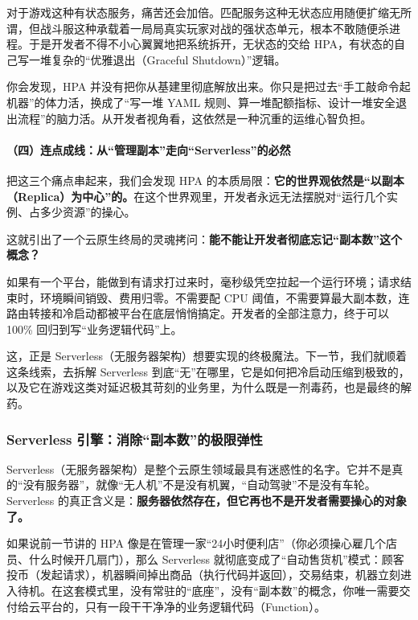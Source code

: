 对于游戏这种有状态服务，痛苦还会加倍。匹配服务这种无状态应用随便扩缩无所谓，但战斗服这种承载着一局局真实玩家对战的强状态单元，根本不敢随便杀进程。于是开发者不得不小心翼翼地把系统拆开，无状态的交给 HPA，有状态的自己写一堆复杂的“优雅退出（Graceful Shutdown）”逻辑。

你会发现，HPA 并没有把你从基建里彻底解放出来。你只是把过去“手工敲命令起机器”的体力活，换成了“写一堆 YAML 规则、算一堆配额指标、设计一堆安全退出流程”的脑力活。从开发者视角看，这依然是一种沉重的运维心智负担。

\paragraph{（四）连点成线：从“管理副本”走向“Serverless”的必然}

把这三个痛点串起来，我们会发现 HPA 的本质局限：\textbf{它的世界观依然是“以副本（Replica）为中心”的。}在这个世界观里，开发者永远无法摆脱对“运行几个实例、占多少资源”的操心。

这就引出了一个云原生终局的灵魂拷问：\textbf{能不能让开发者彻底忘记“副本数”这个概念？}

如果有一个平台，能做到有请求打过来时，毫秒级凭空拉起一个运行环境；请求结束时，环境瞬间销毁、费用归零。不需要配 CPU 阈值，不需要算最大副本数，连路由转接和冷启动都被平台在底层悄悄搞定。开发者的全部注意力，终于可以 100\% 回归到写“业务逻辑代码”上。

这，正是 Serverless（无服务器架构）想要实现的终极魔法。下一节，我们就顺着这条线索，去拆解 Serverless 到底“无”在哪里，它是如何把冷启动压缩到极致的，以及它在游戏这类对延迟极其苛刻的业务里，为什么既是一剂毒药，也是最终的解药。


\subsubsection{Serverless 引擎：消除“副本数”的极限弹性}

Serverless（无服务器架构）是整个云原生领域最具有迷惑性的名字。它并不是真的“没有服务器”，就像“无人机”不是没有机翼，“自动驾驶”不是没有车轮。Serverless 的真正含义是：\textbf{服务器依然存在，但它再也不是开发者需要操心的对象了。}

如果说前一节讲的 HPA 像是在管理一家“24小时便利店”（你必须操心雇几个店员、什么时候开几扇门），那么 Serverless 就彻底变成了“自动售货机”模式：顾客投币（发起请求），机器瞬间掉出商品（执行代码并返回），交易结束，机器立刻进入待机。在这套模式里，没有常驻的“底座”，没有“副本数”的概念，你唯一需要交付给云平台的，只有一段干干净净的业务逻辑代码（Function）。

